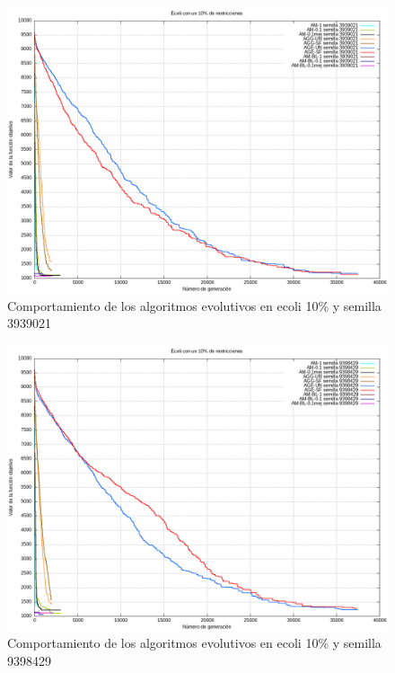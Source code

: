 \documentclass[12pt, spanish]{article}
\begin{document}
\begin{figure}[H]
  \centering
      \includegraphics[scale = 0.50]{ecoli_set_const_10_3939021.png}
 		 \caption{Comportamiento de los algoritmos evolutivos en ecoli 10\% y semilla 3939021}
  		\label{fig:g-213566}

\end{figure}

\begin{figure}[H]
  \centering
      \includegraphics[scale = 0.50]{ecoli_set_const_10_9398429.png}
 		 \caption{Comportamiento de los algoritmos evolutivos en ecoli 10\% y semilla 9398429}
  		\label{fig:g-213566}

\end{figure}
\end{document}
